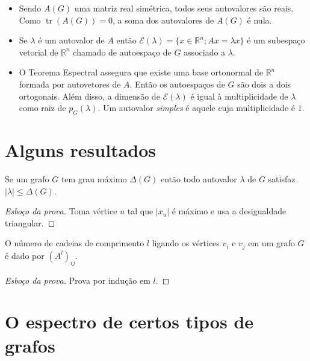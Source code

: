 \documentclass{beamer}
\DeclareMathOperator{\tr}{tr}
\begin{document}
\begin{frame}
    \begin{itemize}
        \item Sendo \(A(G)\) uma matriz real simétrica, todos seus autovalores são reais. Como \(\tr(A(G)) = 0\), a soma dos autovalores de \(A(G)\) é nula.
        \item Se \(\lambda\) é um autovalor de \(A\) então \(\mathcal{E}(\lambda) = \{x \in \mathbb{R}^n; Ax = \lambda x\}\) é um subespaço vetorial de \(\mathbb{R}^n\) chamado de \alert{autoespaço} de \(G\) associado a \(\lambda\).
        \item O Teorema Espectral assegura que existe uma base ortonormal de \(\mathbb{R}^n\) formada por autovetores de \(A\). Então os autoespaços de \(G\) são dois a dois ortogonais. Além disso, a dimensão de \(\mathcal{E}(\lambda)\) é igual à multiplicidade de \(\lambda\) como raiz de \(p_G(\lambda)\). Um autovalor \emph{simples} é aquele cuja multiplicidade é \(1\).
    \end{itemize}
\end{frame}

\section{Alguns resultados}

\begin{frame}
    \begin{prop}
        Se um grafo \(G\) tem grau máximo \(\Delta(G)\) então todo autovalor \(\lambda\) de \(G\) satisfaz \(\vert \lambda \vert \leq \Delta(G)\).
    \end{prop}
    \begin{proof}[Esboço da prova]
        Toma vértice \(u\) tal que \(\vert x_u \vert\) é máximo e usa a desigualdade triangular.
    \end{proof}
    \pause 
    \begin{prop}
        O número de cadeias de comprimento \(l\) ligando os vértices \(v_i\) e \(v_j\) em um grafo \(G\) é dado por \((A^l)_{ij}\).
    \end{prop}
    \begin{proof}[Esboço da prova]
        Prova por indução em \(l\).
    \end{proof}
\end{frame}

\section{O espectro de certos tipos de grafos}
\end{document}
